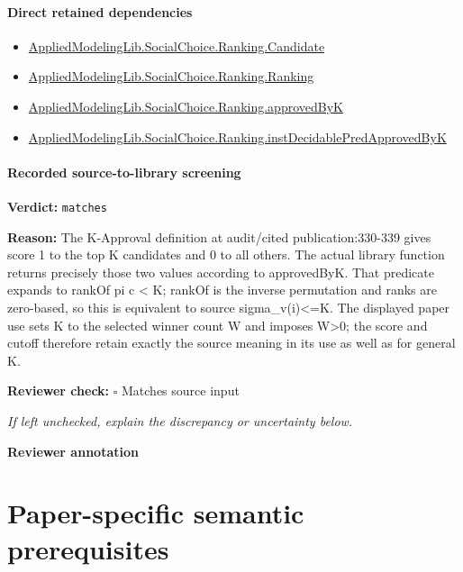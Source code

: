 \documentclass[10pt]{article}
\newcommand{\reviewerbox}{%
  \par\noindent\fbox{\parbox{0.96\linewidth}{\rule{0pt}{0.38in}}}\par
}
\newcommand{\reviewmatch}[1]{%
  \par\noindent\textbf{Reviewer check:} $\square$\; #1\par
  \noindent\emph{If left unchecked, explain the discrepancy or uncertainty below.}\par
}
\begin{document}
\paragraph{Direct retained dependencies}
\begin{itemize}\raggedright
\item \hyperlink{governing-declaration-8c0e6c25845ae78a}{Applied\allowbreak{}Modeling\allowbreak{}Lib.\allowbreak{}Social\allowbreak{}Choice.\allowbreak{}Ranking.\allowbreak{}Candidate}
\item \hyperlink{governing-declaration-5cde54446d1ae021}{Applied\allowbreak{}Modeling\allowbreak{}Lib.\allowbreak{}Social\allowbreak{}Choice.\allowbreak{}Ranking.\allowbreak{}Ranking}
\item \hyperlink{governing-declaration-b5f0521aeeba5270}{Applied\allowbreak{}Modeling\allowbreak{}Lib.\allowbreak{}Social\allowbreak{}Choice.\allowbreak{}Ranking.\allowbreak{}approved\allowbreak{}By\allowbreak{}K}
\item \hyperlink{governing-declaration-5602f733e58cd586}{Applied\allowbreak{}Modeling\allowbreak{}Lib.\allowbreak{}Social\allowbreak{}Choice.\allowbreak{}Ranking.\allowbreak{}inst\allowbreak{}Decidable\allowbreak{}Pred\allowbreak{}Approved\allowbreak{}By\allowbreak{}K}
\end{itemize}
\paragraph{Recorded source-to-library screening}
\textbf{Verdict:} \texttt{matches}
\\
{\raggedright
\textbf{Reason:} The K-\allowbreak{}Approval definition at audit/\allowbreak{}cited publication:\allowbreak{}330-\allowbreak{}339 gives score 1 to the top K candidates and 0 to all others.\allowbreak{} The actual library function returns precisely those two values according to approvedByK.\allowbreak{} That predicate expands to rankOf pi c < K;\allowbreak{} rankOf is the inverse permutation and ranks are zero-\allowbreak{}based, so this is equivalent to source sigma\_\allowbreak{}v(i)<=K.\allowbreak{} The displayed paper use sets K to the selected winner count W and imposes W>0;\allowbreak{} the score and cutoff therefore retain exactly the source meaning in its use as well as for general K.\allowbreak{}
\par}
\reviewmatch{Matches source input}
\noindent\textbf{Reviewer annotation}\par
\reviewerbox
\clearpage
\hypertarget{paper-prerequisite-section-5ef5ef0364b6939c}{}
\section*{Paper-specific semantic prerequisites}
\hypertarget{paper-prerequisite-d3d54108287a800b}{}
\end{document}
